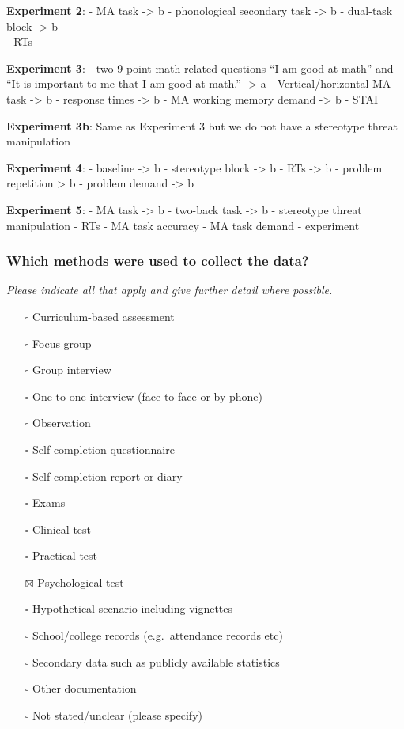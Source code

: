\documentclass[
  doc, a4paper]{apa7}
\providecommand{\tightlist}{%
  \setlength{\itemsep}{0pt}\setlength{\parskip}{0pt}}
\begin{document}
\textbf{Experiment 2}:
- MA task -\textgreater{} b
- phonological secondary task -\textgreater{} b
- dual-task block -\textgreater{} b\\
- RTs

\textbf{Experiment 3}:
- two 9-point math-related questions ``I am good at math'' and ``It is important to me that I am good at math.'' -\textgreater{} a
- Vertical/horizontal MA task -\textgreater{} b
- response times -\textgreater{} b
- MA working memory demand -\textgreater{} b
- STAI

\textbf{Experiment 3b}:
Same as Experiment 3 but we do not have a stereotype threat manipulation

\textbf{Experiment 4}:
- baseline -\textgreater{} b
- stereotype block -\textgreater{} b
- RTs -\textgreater{} b
- problem repetition \textgreater{} b
- problem demand -\textgreater{} b

\textbf{Experiment 5}:
- MA task -\textgreater{} b
- two-back task -\textgreater{} b
- stereotype threat manipulation
- RTs
- MA task accuracy
- MA task demand
- experiment

\subsubsection{Which methods were used to collect the data?}\label{which-methods-were-used-to-collect-the-data}

\emph{Please indicate all that apply and give further detail where possible.}

\begin{itemize}
\tightlist
\item[$\square$]
  Curriculum-based assessment
\item[$\square$]
  Focus group
\item[$\square$]
  Group interview
\item[$\square$]
  One to one interview (face to face or by phone)
\item[$\square$]
  Observation
\item[$\square$]
  Self-completion questionnaire
\item[$\square$]
  Self-completion report or diary
\item[$\square$]
  Exams
\item[$\square$]
  Clinical test
\item[$\square$]
  Practical test
\item[$\boxtimes$]
  Psychological test
\item[$\square$]
  Hypothetical scenario including vignettes
\item[$\square$]
  School/college records (e.g.~attendance records etc)
\item[$\square$]
  Secondary data such as publicly available statistics
\item[$\square$]
  Other documentation
\item[$\square$]
  Not stated/unclear (please specify)
\end{itemize}
\end{document}
